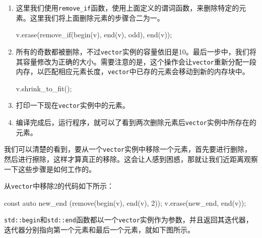 \begin{enumerate}
\item 这里我们使用\texttt{remove\_if}函数，使用上面定义的谓词函数，来删除特定的元素。这里我们将上面删除元素的步骤合二为一。

\begin{codebox}[cpp]
    v.erase(remove_if(begin(v), end(v), odd), end(v));
\end{codebox}

\item 所有的奇数都被删除，不过\texttt{vector}实例的容量依旧是10。最后一步中，我们将其容量修改为正确的大小。需要注意的是，这个操作会让\texttt{vector}重新分配一段内存，以匹配相应元素长度，\texttt{vector}中已存的元素会移动到新的内存块中。

\begin{codebox}[cpp]
    v.shrink_to_fit();
\end{codebox}

\item 打印一下现在\texttt{vector}实例中的元素。

\begin{codebox}[cpp]
    for (auto i : v) {
        cout << i << ", ";
    }
    cout << '\n';
}
\end{codebox}

\item 编译完成后，运行程序，就可以了看到两次删除元素后\texttt{vector}实例中所存在的元素。


\end{enumerate}


我们可以清楚的看到，要从一个\texttt{vector}实例中移除一个元素，首先要进行删除，然后进行擦除，这样才算真正的移除。这会让人感到困惑，那就让我们近距离观察一下这些步骤是如何工作的。

从\texttt{vector}中移除2的代码如下所示：

\begin{codebox}[cpp]
const auto new_end (remove(begin(v), end(v), 2));
v.erase(new_end, end(v));
\end{codebox}

\texttt{std::begin}和\texttt{std::end}函数都以一个\texttt{vector}实例作为参数，并且返回其迭代器，迭代器分别指向第一个元素和最后一个元素，就如下图所示。


